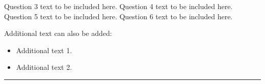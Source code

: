 \documentclass[11pt, a4paper, addpoints]{exam} %
\begin{document}
\begin{questions}
	\droptotalpoints

	\question Question 3 text to be included here. \lipsum[9][1-5]
	\question Question 4 text to be included here. \lipsum[10][1-5]
	\question Question 5 text to be included here. \lipsum[11][1-5]
	\question Question 6 text to be included here. \lipsum[12][1-5]


	Additional text can also be added: \lipsum[9][1-5]
	\begin{itemize}
		\item Additional text 1. \lipsum[10][1-3]
		\item Additional text 2. \lipsum[11][1-4]
	\end{itemize}

	\end{questions}

\noindent \rule{\textwidth}{0.7pt} %
\end{document}
